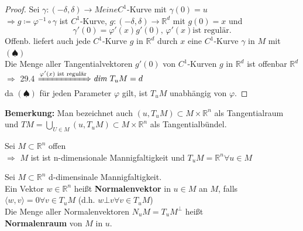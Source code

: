 \begin{proof}
Sei $\gamma: (-\delta, \delta) \rightarrow M eine C^1$-Kurve mit $\gamma(0) = u $ \\
$\Rightarrow g \coloneqq \varphi^{-1} \circ \gamma $ ist $C^1$-Kurve, 
$g: (-\delta, \delta) \rightarrow \mathbb{R}^d $ mit $ g(0) = x $ und
    \begin{equation*}
    \gamma' (0) = \varphi' (x) g'(0) \text{, } \varphi' (x) \text{ist regulär.}
    \tag{$\spadesuit$}
    \end{equation*}
Offenb. liefert auch jede $C^1$-Kurve $g$ in $\mathbb{R}^d $ durch $x$
eine $C^1$-Kurve $\gamma$ in $M$ mit $(\spadesuit)$ \\
Die Menge aller Tangentialvektoren $g'(0)$ von $C^1$-Kurven $g$ in $\mathbb{R}^d $
ist offenbar $\mathbb{R}^d $ \\
$\Rightarrow $ 
29.4 $ \xRightarrow{\varphi' (x) \text{ ist regulär}} \textit{dim } T_uM = d $ \\
da $(\spadesuit)$ für jeden Parameter $\varphi$ gilt, ist $T_uM$ unabhängig von $\varphi$.
\end{proof}

\textbf{Bemerkung:}
Man bezeichnet auch $(u, T_uM) \subset M \times \mathbb{R}^n$
als Tangentialraum und
$TM = \bigcup\limits_{U \in M} (u, T_uM) \subset M \times \mathbb{R}^n $
als Tangentialbündel.

\begin{beispiel}
Sei $M \subset \mathbb{R}^n $ offen  \\
$\Rightarrow $ $M$ ist ist n-dimensionale Mannigfaltigkeit und 
$T_uM = \mathbb{R}^n \forall u \in M $
\end{beispiel}

\begin{definition}
Sei $M \subset \mathbb{R}^n $ d-dimensinale Mannigfaltigkeit. \\
Ein Vektor $w \in \mathbb{R}^n $ heißt \textbf{Normalenvektor} in $u \in M $ an $M$, falls\\
$\langle w,v \rangle = 0 \forall v \in T_uM $
(d.h. $w \bot v \forall v \in T_uM$) \\
Die Menge aller Normalenvektoren $N_uM = T_uM^{\bot} $ heißt \\
\textbf{Normalenraum} von $M$ in $u$. 
\end{definition}
